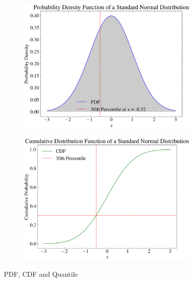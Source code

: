 \begin{figure}
    \centering
    \begin{subfigure}{0.48\columnwidth}
        \centering
        \includegraphics[width=0.8\linewidth]{src/figures/pdf-cdf-quantile/pdf-quantile.png}
    \end{subfigure}
    \begin{subfigure}{0.48\columnwidth}
        \centering
        \includegraphics[width=0.8\linewidth]{src/figures/pdf-cdf-quantile/cdf-quantile.png}
    \end{subfigure}
    \caption{PDF, CDF and Quantile}\label{fig:pdf-cdf-quantile}
\end{figure}
